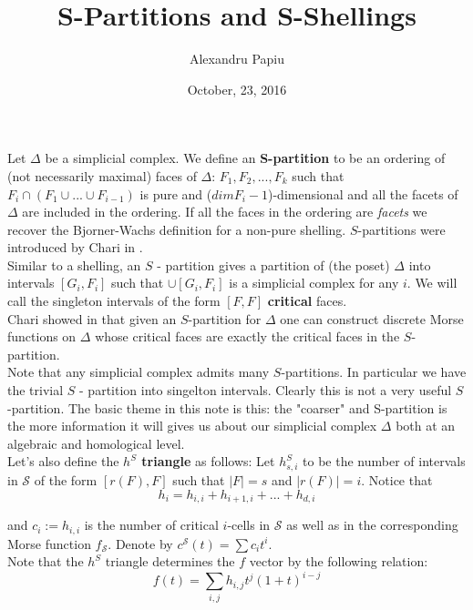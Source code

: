 \documentclass[a4paper]{article}
\title{S-Partitions and S-Shellings}
\author{Alexandru Papiu}
\date{October, 23, 2016}
\begin{document}
\large{

\maketitle


Let $\Delta$ be a simplicial complex. We define an \textbf{S-partition} to be an ordering of (not necessarily maximal) faces of $\Delta$: $F_1,F_2,...,F_k$ such that $F_i\cap (F_1\cup...\cup F_{i-1})$ is pure and ($dim F_i -1$)-dimensional and all the facets of $\Delta$ are included in the ordering. If all the faces in the ordering are \textit{facets} we recover the Bjorner-Wachs definition for a non-pure shelling.  $S$-partitions were introduced by Chari in \cite{chari}. \\

Similar to a shelling, an $S$ - partition gives a partition of (the poset) $\Delta$ into intervals $[G_i,F_i]$ such that $\cup [G_i,F_i]$ is a simplicial complex for any $i$. We will call the singleton intervals of the form $[F,F]$ \textbf{critical} faces. \\


Chari showed in \cite{chari_morse} that given an $S$-partition for $\Delta$ one can construct discrete Morse functions on $\Delta$ whose critical faces are exactly the critical faces in the $S$-partition. \\

Note that any simplicial complex admits many $S$-partitions. In particular we have the trivial $S$ - partition into singelton intervals. Clearly this is not a very useful $S$-partition. The basic theme in this note is this: the "coarser" and S-partition is the more information it will gives us about our simplicial complex $\Delta$ both at an algebraic and homological level. \\


Let's also define the \textbf{$h^S$ triangle} as follows: Let $h_{s,i}^S$ to be the number of intervals in $\mathcal{S}$ of the form $[r(F),F]$ such that $|F| = s$ and $|r(F)| = i$. Notice that $$h_i = h_{i,i}+h_{i+1,i}+...+h_{d,i}$$

and $c_i := h_{i,i}$ is the number of critical $i$-cells in $\mathcal{S}$ as well as in the corresponding Morse function $f_\mathcal{S}$. Denote by $c^\mathcal{S}(t) = \sum c_i t^i$. \\

Note that the $h^S$ triangle determines the $f$ vector by the following relation: 
$$f(t) = \sum_{i,j}h_{i,j}t^j(1+t)^{i-j}  $$

}
\end{document}
